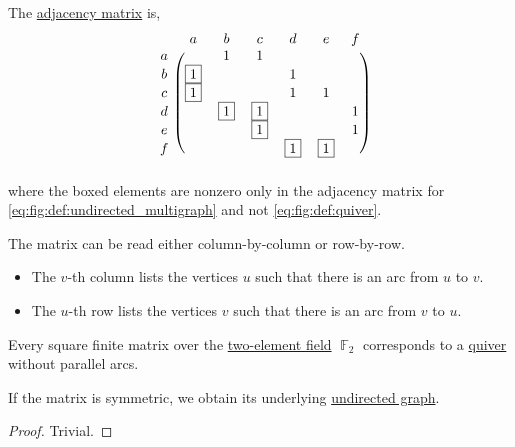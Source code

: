 \begin{example}
  The \hyperref[def:graph_adjacency_matrix]{adjacency matrix} is,
  \begin{equation}\label{ex:quiver_matrices/adjacency}
    \begin{blockarray}{cccccccc}
        & a        & b        & c        & d        & e        & f \\
    \begin{block}{c(ccccccc)}
      a &          & 1        & 1        &          &          &   \\
      b & \fbox{1} &          &          & 1        &          &   \\
      c & \fbox{1} &          &          & 1        & 1        &   \\
      d &          & \fbox{1} & \fbox{1} &          &          & 1 \\
      e &          &          & \fbox{1} &          &          & 1 \\
      f &          &          &          & \fbox{1} & \fbox{1} &   \\
    \end{block}
    \end{blockarray}
  \end{equation}
  where the boxed elements are nonzero only in the adjacency matrix for \eqref{eq:fig:def:undirected_multigraph} and not \eqref{eq:fig:def:quiver}.

  The matrix can be read either column-by-column or row-by-row.
  \begin{itemize}
    \item The \( v \)-th column lists the vertices \( u \) such that there is an arc from \( u \) to \( v \).
    \item The \( u \)-th row lists the vertices \( v \) such that there is an arc from \( v \) to \( u \).
  \end{itemize}
\end{example}

\begin{proposition}\label{thm:graph_undirected_iff_adjacency_matrix_is_symmetric}
  Every square finite matrix over the \hyperref[thm:finite_fields]{two-element field} \( \BbbF_2 \) corresponds to a \hyperref[def:quiver]{quiver} without parallel arcs.

  If the matrix is symmetric, we obtain its underlying \hyperref[def:undirected_multigraph]{undirected graph}.
\end{proposition}
\begin{proof}
  Trivial.
\end{proof}

